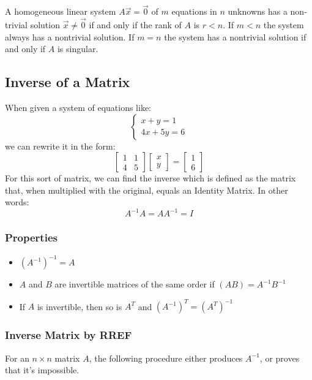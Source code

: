     \begin{thm}
        A homogeneous linear system $A \vec{x} = \vec{0}$ of $m$ equations in $n$ unknowns has a non-trivial solution $\vec{x} \neq \vec{0}$ if and only if the rank of $A$ is $r < n$. If $m < n$ the system always has a nontrivial solution. If $m = n$ the system has a nontrivial solution if and only if $A$ is singular.
    \end{thm}

    \subsection{Inverse of a Matrix}
    When given a system of equations like:
    \[
        \begin{cases}
            x + y = 1\\
            4x + 5y = 6
        \end{cases}
    \]
    we can rewrite it in the form:
    \[
        \left[\begin{array}{cc}
        1 & 1\\
        4 & 5
        \end{array}\right]
        \left[\begin{array}{c}
            x\\
            y
        \end{array}\right] =
        \left[\begin{array}{c}
            1\\
            6
        \end{array}\right]
    \]
    For this sort of matrix, we can find the inverse which is defined as the matrix that, when multiplied with the original, equals an Identity Matrix. In other words:
    \[ A^{-1}A = AA^{-1} = I \]

        \subsubsection{Properties}
        \begin{itemize}
        \item ${( A^{-1})}^{-1} = A$
        \item $A$ and $B$ are invertible matrices of the same order if $\left(AB\right) = A^{-1}B^{-1}$
        \item If $A$ is invertible, then so is $A^T$ and $\left(A^{-1}\right)^T = \left(A^T\right)^{-1}$
        \end{itemize}

        \subsubsection{Inverse Matrix by RREF}
        For an $n\times n$ matrix $A$, the following procedure either produces $A^{-1}$, or proves that it's impossible.

